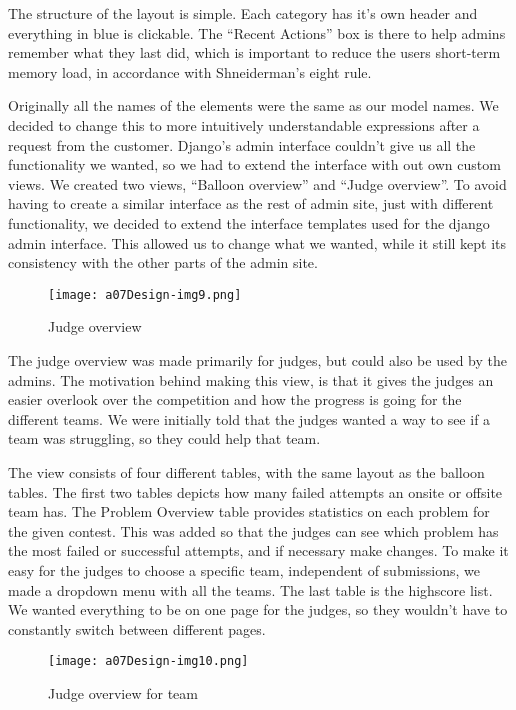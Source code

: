 The structure of the layout is simple. Each category has
it's own header and everything in blue is clickable.
The ``Recent Actions'' box is there
to help admins remember what they last did, which is important to
reduce the users short-term memory load, in accordance with
Shneiderman's eight rule.

Originally all the names of the elements were the same as our model
names. We decided to change this to more intuitively understandable
expressions after a request from the customer. Django's
admin interface couldn't give us all the functionality
we wanted, so we had to extend the interface with out own custom views.
We created two views, ``Balloon overview'' and ``Judge overview''. 
To avoid having to create a similar interface as the rest of admin site,
just with different functionality, we decided to extend the interface 
templates used for the django admin interface. This allowed us to change 
what we wanted, while it still kept its consistency with the other parts 
of the admin site.



 \begin{figure}[h!]
	\texttt{[image: a07Design-img9.png]} 
	\caption{Judge overview}
	\label{fig:judge}
\end{figure}

The judge overview was made primarily for judges, but could also be used
by the admins. The motivation behind making this view, is that it gives
the judges an easier overlook over the competition and how the progress
is going for the different teams. We were initially told that the
judges wanted a way to see if a team was struggling, so they could help
that team.

The view consists of four different tables, with the same layout as the
balloon tables. The first two tables depicts how many failed attempts
an onsite or offsite team has. The Problem Overview table provides
statistics on each problem for the given contest. This was added so
that the judges can see which problem has the most failed or successful
attempts, and if necessary make changes. To make it easy for the judges
to choose a specific team, independent of submissions, we made a
dropdown menu with all the teams. The last table is the highscore list.
We wanted everything to be on one page for the judges, so they
wouldn't have to constantly switch between different
pages.

 \begin{figure}[h!]
	\texttt{[image: a07Design-img10.png]} 
	\caption{Judge overview for team}
	\label{fig:judgeTeam}
\end{figure}


